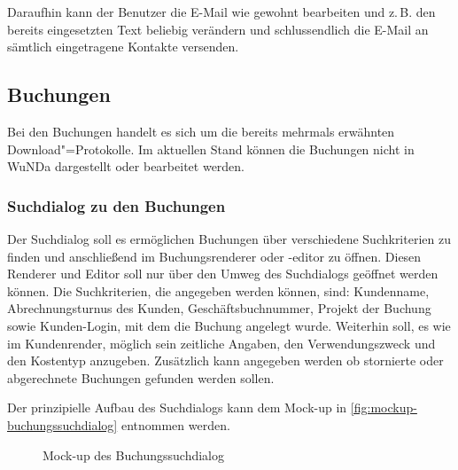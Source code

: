 Daraufhin kann der Benutzer die E-Mail wie gewohnt bearbeiten und z.\,B. den bereits eingesetzten Text beliebig verändern und schlussendlich die E-Mail an sämtlich eingetragene Kontakte versenden.


\subsection{Buchungen} \label{subsec:buchungen}
Bei den Buchungen handelt es sich um die bereits mehrmals erwähnten Download"=Protokolle. Im aktuellen Stand können die Buchungen nicht in \ac{WuNDa} dargestellt oder bearbeitet werden.

\subsubsection{Suchdialog zu den Buchungen} 
Der Suchdialog soll es ermöglichen Buchungen über verschiedene Suchkriterien zu finden und anschließend im Buchungsrenderer oder -editor zu öffnen.
Diesen Renderer und Editor soll nur über den Umweg des Suchdialogs geöffnet werden können. 
Die Suchkriterien, die angegeben werden können, sind: Kundenname, Abrechnungsturnus des Kunden, Geschäftsbuchnummer, Projekt der Buchung sowie Kunden-Login, mit dem die Buchung angelegt wurde.
Weiterhin soll, es wie im Kundenrender, möglich sein zeitliche Angaben, den Verwendungszweck und den Kostentyp anzugeben. Zusätzlich kann angegeben werden ob stornierte oder abgerechnete Buchungen gefunden werden sollen.

Der prinzipielle Aufbau des Suchdialogs kann dem Mock-up in \autoref{fig:mockup-buchungssuchdialog} entnommen werden.
\begin{figure}[htbp]
	\centering
	\caption{Mock-up des Buchungssuchdialog}
	\label{fig:mockup-buchungssuchdialog}
\end{figure}

